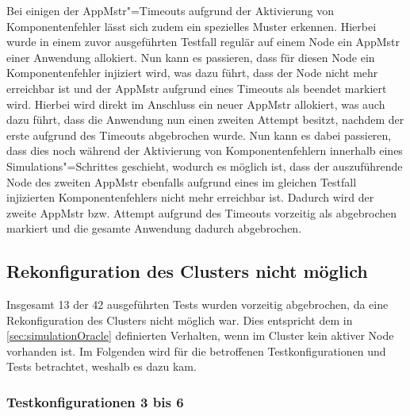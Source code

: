 Bei einigen der \ac{AppMstr}"=Timeouts aufgrund der Aktivierung von Komponentenfehler lässt sich zudem ein spezielles Muster erkennen.
Hierbei wurde in einem zuvor ausgeführten Testfall regulär auf einem Node ein \ac{AppMstr} einer Anwendung allokiert.
Nun kann es passieren, dass für diesen Node ein Komponentenfehler injiziert wird, was dazu führt, dass der Node nicht mehr erreichbar ist und der \ac{AppMstr} aufgrund eines Timeouts als beendet markiert wird.
Hierbei wird direkt im Anschluss ein neuer \ac{AppMstr} allokiert, was auch dazu führt, dass die Anwendung nun einen zweiten Attempt besitzt, nachdem der erste aufgrund des Timeouts abgebrochen wurde.
Nun kann es dabei passieren, dass dies noch während der Aktivierung von Komponentenfehlern innerhalb eines Simulations"=Schrittes geschieht, wodurch es möglich ist, dass der auszuführende Node des zweiten \ac{AppMstr} ebenfalls aufgrund eines im gleichen Testfall injizierten Komponentenfehlers nicht mehr erreichbar ist.
Dadurch wird der zweite \ac{AppMstr} bzw. Attempt aufgrund des Timeouts vorzeitig als abgebrochen markiert und die gesamte Anwendung dadurch abgebrochen.

\subsection{Rekonfiguration des Clusters nicht möglich}
\label{sec:noReconfig}

Insgesamt 13 der 42 ausgeführten Tests wurden vorzeitig abgebrochen, da eine Rekonfiguration des Clusters nicht möglich war.
Dies entspricht dem in \autoref{sec:simulationOracle} definierten Verhalten, wenn im Cluster kein aktiver Node vorhanden ist.
Im Folgenden wird für die betroffenen Testkonfigurationen und Tests betrachtet, weshalb es dazu kam.

\subsubsection{Testkonfigurationen 3 bis 6}
\label{sec:noReconf36}

